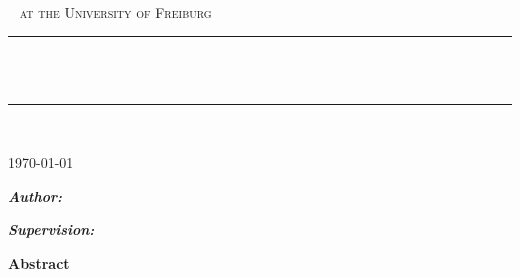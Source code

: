 \begin{titlepage}
	
	\begin{center}
		
		\hbox{}
		\vspace{0.5cm}
		
		\textsc{\LARGE \\\
			\vspace{0.2cm} at the University of Freiburg}\\[0.5cm]
		
		
		\newcommand{\HRule}{\rule{\linewidth}{0.5mm}}
		\HRule \\[0.5cm]
		{ \huge \bfseries \vtitle}\\[0.2cm]
		\HRule \\ [0.2cm]
		\vspace{-17pt}
		\begin{flushright}
			\today
		\end{flushright}
		\vspace{2cm}
		
		\begin{minipage}{0.4\textwidth}
			\begin{flushleft} \large
				\emph{\Large \textbf{Author:}}\\[0.2cm]
				\vauthor
				
			\end{flushleft}
		\end{minipage}
		\hfill
		\begin{minipage}{0.4\textwidth}
			\begin{flushright} \large
				\emph{\Large \textbf{Supervision:}}\\[0.2cm]
				\supervision
			\end{flushright}
		\end{minipage}
	\end{center}
	\vspace{2cm}
\begin{center}

	\textbf{Abstract}\qquad
\end{center}
	\presummary

\end{titlepage}
